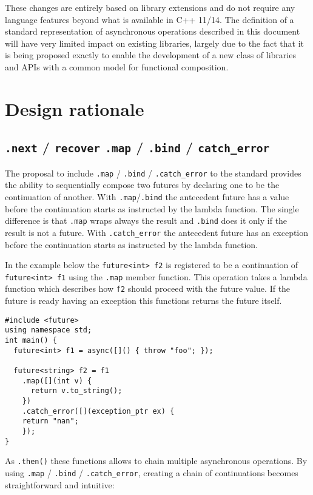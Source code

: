 \documentclass[a4paper,10pt]{article}
\newcommand{\cpp}[1]{\lstinline{#1}}
\newcommand{\suppress}[1]{\colorbox{suppress_color}{#1}}
\newcommand{\update}[1]{\colorbox{update_color}{#1}}
\begin{document}
These changes are entirely based on library extensions and do not require any language features beyond what is available in C++ 11/14. The definition of a standard representation of asynchronous operations described in this document will have very limited impact on existing libraries, largely due to the fact that it is being proposed exactly to enable the development of a new class of libraries and APIs with a common model for functional composition. 

\section{Design rationale}

\subsection{\suppress{\cpp{.next} / \cpp{recover}} \update{\cpp{.map} / \cpp{.bind} / \cpp{catch_error}}}


The proposal to include  \cpp{.map} / \cpp{.bind} / \cpp{.catch_error} to the standard provides the ability to sequentially compose two futures by declaring one to be the continuation of another. With \cpp{.map}/\cpp{.bind} the antecedent future has a value before the continuation starts as instructed by the lambda function. The single difference is that  \cpp{.map} wraps always the result and \cpp{.bind} does it only if the result is not a future. With \cpp{.catch_error} the antecedent future has an exception before the continuation starts as instructed by the lambda function.
 
In the example below the \cpp{future<int> f2} is registered to be a continuation of \cpp{future<int> f1} using the \cpp{.map} 
member function. This operation takes a lambda function which describes how \cpp{f2} should proceed with the future value. If the future is ready having an exception this functions returns the future itself.

\begin{lstlisting}[xleftmargin=0pt]
#include <future> 
using namespace std; 
int main() { 
  future<int> f1 = async([]() { throw "foo"; }); 
 
  future<string> f2 = f1
    .map([](int v) { 
      return v.to_string();
    })
    .catch_error([](exception_ptr ex) {
	return "nan";
    }); 
}
\end{lstlisting}
 
As \cpp{.then()} these functions allows to chain multiple asynchronous operations. By using \cpp{.map} / \cpp{.bind} / \cpp{.catch_error}, creating a chain of continuations becomes straightforward and intuitive:
 
\end{document}
